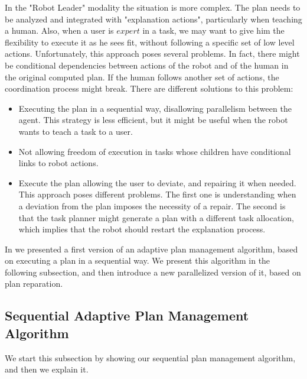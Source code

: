 In the "Robot Leader" modality the situation is more complex. The plan needs to be analyzed and integrated with "explanation actions", particularly when teaching a human. Also, when a user is $expert$ in a task, we may want to give him the flexibility to execute it as he sees fit, without following a specific set of low level actions.  Unfortunately, this approach poses several problems. In fact, there might be conditional dependencies between actions of the robot and of the human in the original computed plan. If the human follows another set of actions, the coordination process might break. There are different solutions to this problem:
\begin{itemize}
	\item Executing the plan in a sequential way, disallowing parallelism between the agent. This strategy is less efficient, but it might be useful when the robot wants to teach a task to a user.
	\item Not allowing freedom of execution in tasks whose children have conditional links to robot actions. 
	\item Execute the plan allowing the user to deviate, and repairing it when needed. This approach poses different problems. The first one is understanding when a deviation from the plan imposes the necessity of a repair. The second is that the task planner might generate a plan with a different task allocation, which implies that the robot should restart the explanation process.
\end{itemize}

In \cite{milliez2016using} we presented a first version of an adaptive plan management algorithm, based on executing a plan in a sequential way. We present this algorithm in the following subsection, and then introduce a new parallelized version of it, based on plan reparation.

\subsection{Sequential Adaptive Plan Management Algorithm}
\label{subsec:plan_management-sequential_plan_management}
We start this subsection by showing our sequential plan management algorithm, and then we explain it.

